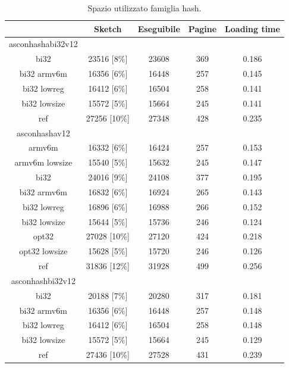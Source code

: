 \documentclass[12pt,a4paper,italian]{report}
\begin{document}
\begin{table}[h]
    \caption{Spazio utilizzato famiglia hash.}
    \centering
	\begin{tabular}{|c|c|c|c|c|}
		\hline
         & Sketch & Eseguibile & Pagine & Loading time \\
        \hline
        asconhashabi32v12 & & & & \\
        \hline
        bi32 & 23516 [8\%] & 23608 & 369 & 0.186 \\
        \hline
        bi32 armv6m & 16356 [6\%] & 16448 & 257 & 0.145 \\
        \hline
        bi32 lowreg & 16412 [6\%] & 16504 & 258 & 0.141 \\
        \hline
        bi32 lowsize & 15572 [5\%] & 15664 & 245 & 0.141 \\
        \hline
        ref & 27256 [10\%] & 27348 & 428 & 0.235 \\
        \hline
        asconhashav12 & & & & \\
        \hline
        armv6m & 16332 [6\%] & 16424 & 257 & 0.153 \\
        \hline
        armv6m lowsize & 15540 [5\%] & 15632 & 245 & 0.147 \\
        \hline
        bi32 & 24016 [9\%] & 24108 & 377 & 0.195 \\
        \hline
        bi32 armv6m & 16832 [6\%] & 16924 & 265 & 0.143 \\
        \hline
        bi32 lowreg & 16896 [6\%] & 16988 & 266 & 0.152 \\
        \hline
        bi32 lowsize & 15644 [5\%] & 15736 & 246 & 0.124 \\
        \hline
        opt32 & 27028 [10\%] & 27120 & 424 & 0.218 \\
        \hline
        opt32 lowsize & 15628 [5\%] & 15720 & 246 & 0.126 \\
        \hline
        ref & 31836 [12\%] & 31928 & 499 & 0.256 \\
        \hline
        asconhashbi32v12 & & & & \\
        \hline
        bi32 & 20188 [7\%] & 20280 & 317 & 0.181 \\
        \hline
        bi32 armv6m & 16356 [6\%] & 16448 & 257 & 0.148 \\
        \hline
        bi32 lowreg & 16412 [6\%] & 16504 & 258 & 0.148 \\
        \hline
        bi32 lowsize & 15572 [5\%] & 15664 & 245 & 0.129 \\
        \hline
        ref & 27436 [10\%] & 27528 & 431 & 0.239 \\

\end{tabular}
\end{table}
\end{document}
